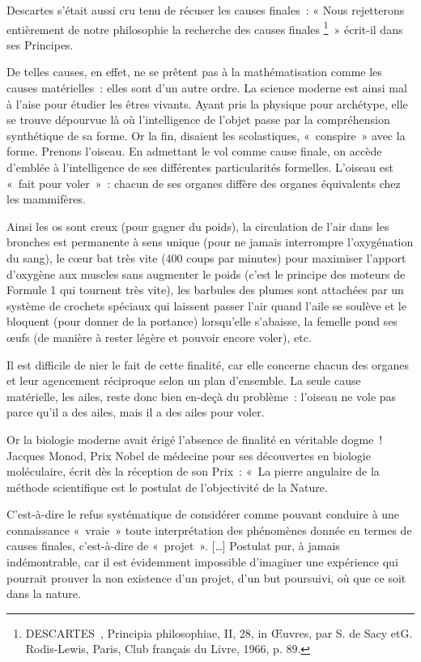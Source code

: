 \documentclass[a4paper,12pt]{article}
\begin{document}
Descartes s'était aussi cru tenu de récuser les causes finales : « Nous rejetterons entièrement de notre philosophie la recherche des causes finales \footnote{DESCARTES , Principia philosophiae, II, 28, in Œuvres, par S. de Sacy etG. Rodis-Lewis, Paris, Club français du Livre, 1966, p. 89.} » écrit-il dans ses Principes. 

De telles causes, en effet, ne se prêtent pas à la mathématisation comme les causes matérielles : elles sont d'un autre ordre. La science moderne est ainsi mal à l'aise pour étudier les êtres vivants. Ayant pris la physique pour archétype, elle se trouve dépourvue là où l'intelligence de l'objet passe par la compréhension synthétique de sa forme. Or la fin, disaient les scolastiques, « conspire » avec la forme. Prenons l'oiseau. En admettant le vol comme cause finale, on accède d’emblée à l'intelligence de ses différentes particularités formelles. L'oiseau est « fait pour voler » : chacun de ses organes diffère des organes équivalents chez les mammifères. 

Ainsi les os sont creux (pour gagner du poids), la circulation de l'air dans les bronches est permanente à sens unique (pour ne jamais interrompre l'oxygénation du sang), le cœur bat très vite (400 coups par minutes) pour maximiser l'apport d'oxygène aux muscles sans augmenter le poids (c'est le principe des moteurs de Formule 1 qui tournent très vite), les barbules des plumes sont attachées par un système de crochets spéciaux qui laissent passer l'air quand l'aile se soulève et le bloquent (pour donner de la portance) lorsqu'elle s'abaisse, la femelle pond ses œufs (de manière à rester légère et pouvoir encore voler), etc. 

Il est difficile de nier le fait de cette finalité, car elle concerne chacun des organes et leur agencement réciproque selon un plan d'ensemble. La seule cause matérielle, les ailes, reste donc bien en-deçà du problème : l’oiseau ne vole pas parce qu'il a des ailes, mais il a des ailes pour voler.

Or la biologie moderne avait érigé l'absence de finalité en véritable dogme ! Jacques Monod, Prix Nobel de médecine pour ses découvertes en biologie moléculaire, écrit dès la réception de son Prix : « La pierre angulaire de la méthode scientifique est le postulat de l’objectivité de la Nature. 

C’est-à-dire le refus systématique de considérer comme pouvant conduire à une connaissance « vraie » toute interprétation des phénomènes donnée en termes de causes finales, c’est-à-dire de « projet ». […] Postulat pur, à jamais indémontrable, car il est évidemment impossible d’imaginer une expérience qui pourrait prouver la non existence d’un projet, d’un but poursuivi, où que ce soit dans la nature. 
\end{document}
